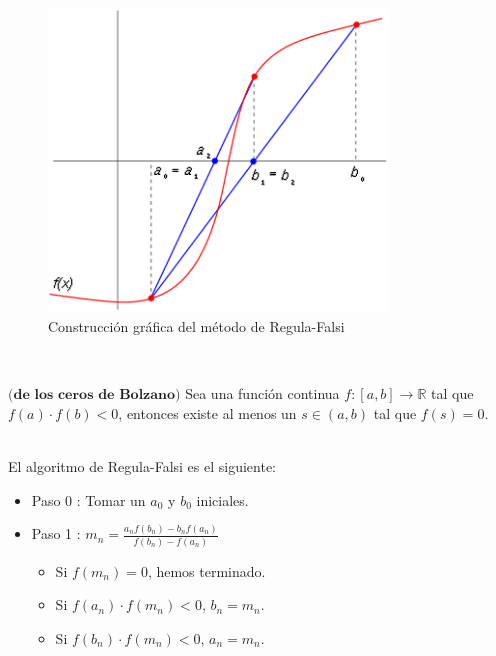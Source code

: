 \begin{figure}[h]
	\begin{center}
		\includegraphics[width=0.8\textwidth]{imagenes/regulaF.png}
	\end{center}
	\caption{Construcción gráfica del método de Regula-Falsi}
	\label{fig:etiq_8}
\end{figure}
${ }$\\

\begin{teorema}\label{teo:bolzano}
	$\textbf{(de los ceros de Bolzano)}$ Sea una función continua $f : [a,b] \to \mathbb{R}$ tal que $f(a) \cdot f(b) < 0$, entonces existe al menos un $s \in (a,b)$ tal que $f(s) = 0$.
\end{teorema}
${ }$\\



El algoritmo de Regula-Falsi es el siguiente:

\begin{itemize}
	\item Paso 0 : Tomar un $a_0$ y $b_0$ iniciales.
	\item Paso 1 : $m_n = \frac{a_n f(b_n) - b_n f(a_n)}{f(b_n) - f(a_n)}$
	\begin{itemize}
		\item Si $f(m_n)=0$, hemos terminado.
		\item Si $f(a_n) \cdot f(m_n) < 0$, $b_n = m_n$.
		\item Si $f(b_n) \cdot f(m_n) < 0$, $a_n = m_n$.
	\end{itemize}
\end{itemize}
${ }$\\

